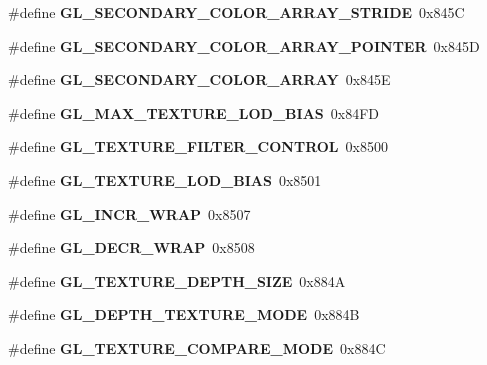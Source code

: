 \begin{DoxyCompactItemize}
\item 
\#define {\bfseries G\+L\+\_\+\+S\+E\+C\+O\+N\+D\+A\+R\+Y\+\_\+\+C\+O\+L\+O\+R\+\_\+\+A\+R\+R\+A\+Y\+\_\+\+S\+T\+R\+I\+D\+E}~0x845\+C\label{_s_d_l__opengl_8h_a6de5c3369b29b78b9e817e130c4e13a3}

\item 
\#define {\bfseries G\+L\+\_\+\+S\+E\+C\+O\+N\+D\+A\+R\+Y\+\_\+\+C\+O\+L\+O\+R\+\_\+\+A\+R\+R\+A\+Y\+\_\+\+P\+O\+I\+N\+T\+E\+R}~0x845\+D\label{_s_d_l__opengl_8h_a91c34b3865bc510b1a61738cb2634aed}

\item 
\#define {\bfseries G\+L\+\_\+\+S\+E\+C\+O\+N\+D\+A\+R\+Y\+\_\+\+C\+O\+L\+O\+R\+\_\+\+A\+R\+R\+A\+Y}~0x845\+E\label{_s_d_l__opengl_8h_a6ac28b896f75279635379ad3df75404c}

\item 
\#define {\bfseries G\+L\+\_\+\+M\+A\+X\+\_\+\+T\+E\+X\+T\+U\+R\+E\+\_\+\+L\+O\+D\+\_\+\+B\+I\+A\+S}~0x84\+F\+D\label{_s_d_l__opengl_8h_af3c04d4a742575ddfbfbea5569f8386d}

\item 
\#define {\bfseries G\+L\+\_\+\+T\+E\+X\+T\+U\+R\+E\+\_\+\+F\+I\+L\+T\+E\+R\+\_\+\+C\+O\+N\+T\+R\+O\+L}~0x8500\label{_s_d_l__opengl_8h_a375902931852ab1b76ef575c01746b09}

\item 
\#define {\bfseries G\+L\+\_\+\+T\+E\+X\+T\+U\+R\+E\+\_\+\+L\+O\+D\+\_\+\+B\+I\+A\+S}~0x8501\label{_s_d_l__opengl_8h_a40c7ab0c2d1b3d6c7d12cdb317bb3e61}

\item 
\#define {\bfseries G\+L\+\_\+\+I\+N\+C\+R\+\_\+\+W\+R\+A\+P}~0x8507\label{_s_d_l__opengl_8h_ae9efa4d7622ad01999c4c29081218943}

\item 
\#define {\bfseries G\+L\+\_\+\+D\+E\+C\+R\+\_\+\+W\+R\+A\+P}~0x8508\label{_s_d_l__opengl_8h_ae394492c09563af8f82764c864d77864}

\item 
\#define {\bfseries G\+L\+\_\+\+T\+E\+X\+T\+U\+R\+E\+\_\+\+D\+E\+P\+T\+H\+\_\+\+S\+I\+Z\+E}~0x884\+A\label{_s_d_l__opengl_8h_a73ddc0f0c3f8f296d0b01da64b710193}

\item 
\#define {\bfseries G\+L\+\_\+\+D\+E\+P\+T\+H\+\_\+\+T\+E\+X\+T\+U\+R\+E\+\_\+\+M\+O\+D\+E}~0x884\+B\label{_s_d_l__opengl_8h_a878be7212e908bb676501a98cfee4a57}

\item 
\#define {\bfseries G\+L\+\_\+\+T\+E\+X\+T\+U\+R\+E\+\_\+\+C\+O\+M\+P\+A\+R\+E\+\_\+\+M\+O\+D\+E}~0x884\+C\label{_s_d_l__opengl_8h_af5a50515d121e0ef24a67977c667add0}


\end{DoxyCompactItemize}
